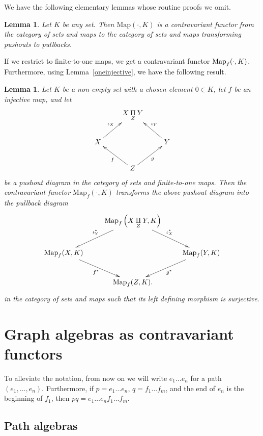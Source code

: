 \documentclass[12pt,times,a4paper]{amsart}
\newtheorem{lemma}[theorem]{Lemma}
\numberwithin{equation}{section}
\numberwithin{equation}{section}
\begin{document}
We have the following elementary lemmas whose routine proofs we omit.
\begin{lemma}\label{lemma73}
Let $K$ be any set. Then $\mathrm{Map}(\cdot,K)$ is a contravariant functor from the category of sets
and maps to the category of sets and maps transforming pushouts to pullbacks.
\end{lemma}
\noindent If we restrict to finite-to-one maps, we get a contravariant functor ${\rm Map}_f(\cdot,K)$. 
Furthermore, using Lemma~\ref{oneinjective}, we have the following result.
\begin{lemma}\label{finitepushtopull}
Let $K$ be a non-empty set with a chosen element $0\in K$,  let $f$ be an injective map, and let
\begin{equation*}
\xymatrix{
&
X\underset{Z}{\amalg}Y
&\\
X
\ar[ur]^{\iota_X}& & 
Y
\ar[ul]_{\iota_Y}\\
&
Z
\ar[ur]_{g}\ar[ul]^{f}&
}
\end{equation*}
be a pushout diagram in the category of sets and finite-to-one maps.
Then  the contravariant functor $\mathrm{Map}_f(\cdot,K)$ transforms the above pushout diagram
into the  pullback dia\-gram
\begin{equation*}
\xymatrix{
&
\mathrm{Map}_f\left(X\underset{Z}{\amalg}Y,K\right) 
\ar[dl]_{\iota_Y^*}\ar[dr]^{\iota_X^*}
&\\
\mathrm{Map}_f(X,K)
\ar[dr]_{f^{*}}& & 
\mathrm{Map}_f(Y,K)
\ar[dl]^{g^{*}}\\
&
\mathrm{Map}_f(Z,K).
&
}
\end{equation*}
in the category of sets and maps such that its left defining morphism is surjective.
\end{lemma}


\section{Graph algebras as contravariant functors}

\noindent To alleviate the notation, from now on we will write $e_1\ldots e_n$ for a path $(e_1,\ldots,e_n)$. Furthermore, if $p=e_1\ldots e_n$, $q=f_1\ldots f_m$, and the end of $e_n$ is the beginning of $f_1$, then $pq=e_1\ldots e_n f_1\ldots f_m$.

\subsection{Path algebras}
\end{document}
